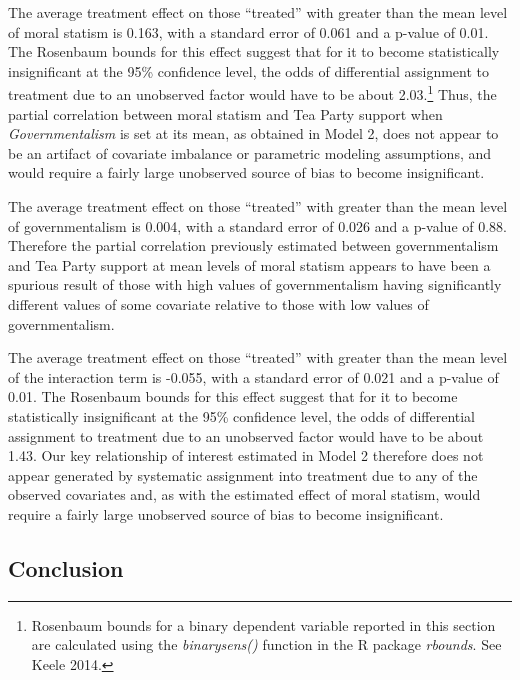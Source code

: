 \documentclass[12pt,]{article}
\begin{document}
The average treatment effect on those ``treated'' with greater than the
mean level of moral statism is 0.163, with a standard error of 0.061 and
a p-value of 0.01. The Rosenbaum bounds for this effect suggest that for
it to become statistically insignificant at the 95\% confidence level,
the odds of differential assignment to treatment due to an unobserved
factor would have to be about 2.03.\footnote{Rosenbaum bounds for a
  binary dependent variable reported in this section are calculated
  using the \emph{binarysens()} function in the R package
  \emph{rbounds}. See Keele 2014.} Thus, the partial correlation between
moral statism and Tea Party support when \emph{Governmentalism} is set
at its mean, as obtained in Model 2, does not appear to be an artifact
of covariate imbalance or parametric modeling assumptions, and would
require a fairly large unobserved source of bias to become
insignificant.

The average treatment effect on those ``treated'' with greater than the
mean level of governmentalism is 0.004, with a standard error of 0.026
and a p-value of 0.88. Therefore the partial correlation previously
estimated between governmentalism and Tea Party support at mean levels
of moral statism appears to have been a spurious result of those with
high values of governmentalism having significantly different values of
some covariate relative to those with low values of governmentalism.

The average treatment effect on those ``treated'' with greater than the
mean level of the interaction term is -0.055, with a standard error of
0.021 and a p-value of 0.01. The Rosenbaum bounds for this effect
suggest that for it to become statistically insignificant at the 95\%
confidence level, the odds of differential assignment to treatment due
to an unobserved factor would have to be about 1.43. Our key
relationship of interest estimated in Model 2 therefore does not appear
generated by systematic assignment into treatment due to any of the
observed covariates and, as with the estimated effect of moral statism,
would require a fairly large unobserved source of bias to become
insignificant.

\subsection{Conclusion}\label{conclusion}
\end{document}
